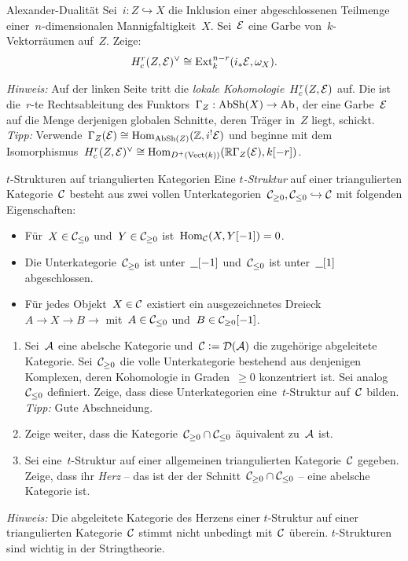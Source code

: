 \documentclass{uebblatt}
\begin{document}
\begin{aufgabe}{Alexander-Dualität}
Sei~$i : Z \hookrightarrow X$ die Inklusion einer abgeschlossenen Teilmenge
einer~$n$-dimensionalen Mannigfaltigkeit~$X$. Sei~$\mathcal{E}$ eine Garbe
von~$k$-Vektorräumen auf~$Z$. Zeige: \[ H_c^r(Z,\mathcal{E})^\vee \cong
\mathrm{Ext}_k^{n-r}(i_*\mathcal{E}, \omega_X). \]

{\tiny\emph{Hinweis:} Auf der linken Seite tritt die \emph{lokale
Kohomologie}~$H_c^r(Z,\mathcal{E})$ auf. Die ist die~$r$-te Rechtsableitung des
Funktors~$\Gamma_Z : \mathrm{AbSh}(X) \to \mathrm{Ab}$, der eine Garbe~$\mathcal{E}$ auf die Menge
derjenigen globalen Schnitte, deren Träger in~$Z$ liegt, schickt. \emph{Tipp:}
Verwende~$\Gamma_Z(\mathcal{E}) \cong \mathrm{Hom}_{\mathrm{AbSh}(Z)}(\mathbb{Z},i^!\mathcal{E})$ und beginne mit dem
Isomorphismus~$H_c^r(Z,\mathcal{E})^\vee \cong \mathrm{Hom}_{D^+(\mathrm{Vect}(k))}(\mathbb{R} \Gamma_Z(\mathcal{E}),
k[-r])$.\par}
\end{aufgabe}

\begin{aufgabe}{$t$-Strukturen auf triangulierten Kategorien}
Eine \emph{$t$-Struktur} auf einer triangulierten Kategorie~$\mathcal{C}$ besteht aus
zwei vollen Unterkategorien~$\mathcal{C}_{\geq 0}, \mathcal{C}_{\leq 0} \hookrightarrow \mathcal{C}$ mit
folgenden Eigenschaften:
\begin{itemize}
\item Für~$X \in \mathcal{C}_{\leq 0}$ und~$Y \in \mathcal{C}_{\geq 0}$ ist~$\mathrm{Hom}_{\mathcal{C}}(X,Y[-1]) =
0$.
\item Die Unterkategorie~$\mathcal{C}_{\geq 0}$ ist
unter~$\underline{\ \ }[-1]$ und~$\mathcal{C}_{\leq 0}$ ist
unter~$\underline{\ \ }[1]$ abgeschlossen.
\item Für jedes Objekt~$X \in \mathcal{C}$ existiert ein ausgezeichnetes Dreieck~$A \to
X \to B \to$ mit~$A \in \mathcal{C}_{\leq 0}$ und~$B \in \mathcal{C}_{\geq 0}[-1]$.
\end{itemize}
\begin{enumerate}
\item Sei~$\mathcal{A}$ eine abelsche Kategorie und~$\mathcal{C} \vcentcolon= \mathcal{D}(\mathcal{A})$ die zugehörige
abgeleitete Kategorie. Sei~$\mathcal{C}_{\geq 0}$ die volle Unterkategorie bestehend aus
denjenigen Komplexen, deren Kohomologie in Graden~$\geq 0$ konzentriert ist.
Sei analog~$\mathcal{C}_{\leq 0}$ definiert. Zeige, dass diese Unterkategorien
eine~$t$-Struktur auf~$\mathcal{C}$ bilden. {\tiny\emph{Tipp:} Gute Abschneidung.}
\item Zeige weiter, dass die Kategorie~$\mathcal{C}_{\geq 0} \cap \mathcal{C}_{\leq 0}$ äquivalent zu~$\mathcal{A}$ ist.
\item Sei eine~$t$-Struktur auf einer allgemeinen triangulierten Kategorie~$\mathcal{C}$
gegeben. Zeige, dass ihr \emph{Herz} -- das ist der der Schnitt~$\mathcal{C}_{\geq 0}
\cap \mathcal{C}_{\leq 0}$ -- eine abelsche Kategorie ist.
\end{enumerate}
{\tiny\emph{Hinweis:} Die abgeleitete Kategorie des Herzens einer $t$-Struktur
auf einer triangulierten Kategorie~$\mathcal{C}$ stimmt nicht unbedingt mit~$\mathcal{C}$
überein. $t$-Strukturen sind wichtig in der Stringtheorie.\par}
\end{aufgabe}
\end{document}
